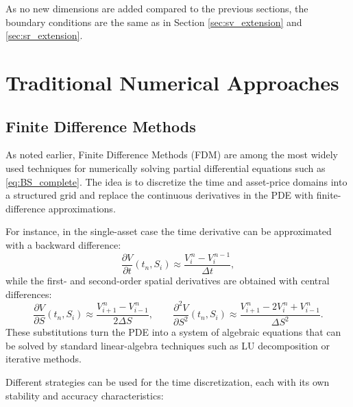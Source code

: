 \documentclass[12pt]{report} %
\theoremstyle{plain} %
\theoremstyle{definition} %
\theoremstyle{remark} %
\begin{document}
As no new dimensions are added compared to the previous sections, the boundary conditions are the same as 
in Section \ref{sec:sv_extension} and \ref{sec:sr_extension}.

\section{Traditional Numerical Approaches}

\subsection{Finite Difference Methods}
As noted earlier, Finite Difference Methods (FDM) are among the most widely used
techniques for numerically solving partial differential equations such as
\eqref{eq:BS_complete}. The idea is to discretize the time and asset-price domains
into a structured grid and replace the continuous derivatives in the PDE with
finite-difference approximations.

For instance, in the single-asset case the time derivative can be approximated
with a backward difference:
\[
 \frac{\partial V}{\partial t}(t_n, S_i) \approx 
 \frac{V_i^{\,n}-V_i^{\,n-1}}{\Delta t},
\]
while the first- and second-order spatial derivatives are obtained with central
differences:
\[
 \frac{\partial V}{\partial S}(t_n, S_i) \approx
 \frac{V_{i+1}^{\,n}-V_{i-1}^{\,n}}{2\Delta S},
 \qquad
 \frac{\partial^{2}V}{\partial S^{2}}(t_n, S_i) \approx
 \frac{V_{i+1}^{\,n}-2V_{i}^{\,n}+V_{i-1}^{\,n}}{\Delta S^{2}}.
\]
These substitutions turn the PDE into a system of algebraic equations that can
be solved by standard linear-algebra techniques such as LU decomposition or
iterative methods.

Different strategies can be used for the time discretization, 
each with its own stability and accuracy characteristics:
\end{document}
